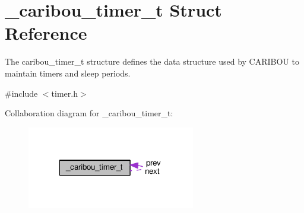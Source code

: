 \hypertarget{struct__caribou__timer__t}{\section{\-\_\-caribou\-\_\-timer\-\_\-t Struct Reference}
\label{struct__caribou__timer__t}
}


The caribou\-\_\-timer\-\_\-t structure defines the data structure used by C\-A\-R\-I\-B\-O\-U to maintain timers and sleep periods.  




{\ttfamily \#include $<$timer.\-h$>$}



Collaboration diagram for \-\_\-caribou\-\_\-timer\-\_\-t\-:\nopagebreak
\begin{figure}[H]
\begin{center}
\leavevmode
\includegraphics[width=208pt]{struct__caribou__timer__t__coll__graph}
\end{center}
\end{figure}

